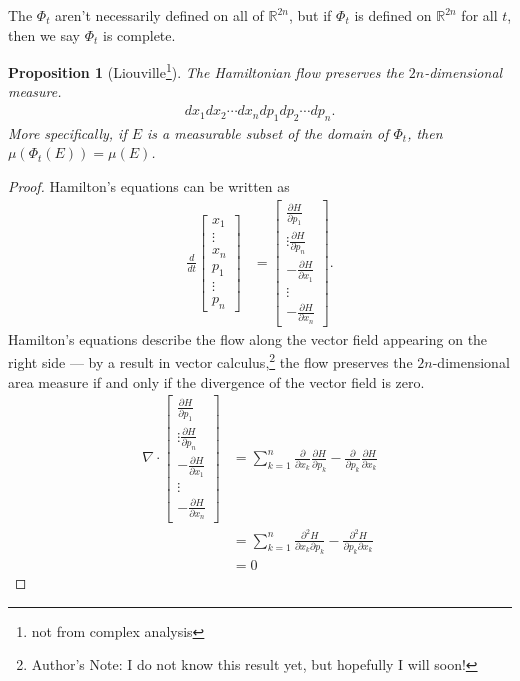 \documentclass[10pt]{extarticle}
\newcommand{\R}{\mathbb{R}}
\theoremstyle{plain}
\newtheorem*{proposition}{Proposition}%
\theoremstyle{definition}
\theoremstyle{remark}
\begin{document}
  The $\Phi_t$ aren't necessarily defined on all of $\R^{2n}$, but if $\Phi_t$ is defined on $\R^{2n}$ for all $t$, then we say $\Phi_t$ is complete.
  \begin{proposition}[Liouville\footnote{not from complex analysis}]
    The Hamiltonian flow preserves the $2n$-dimensional measure.
    \begin{align*}
      dx_1 dx_2 \cdots dx_n dp_1 dp_2 \cdots dp_n.
    \end{align*}
    More specifically, if $E$ is a measurable subset of the domain of $\Phi_t$, then $\mu\left(\Phi_t(E)\right) = \mu(E)$.
  \end{proposition}
  \begin{proof}
    Hamilton's equations can be written as
        \begin{align*}
          \frac{d}{dt} \begin{bmatrix}x_1\\\vdots\\x_n\\p_1\\\vdots\\p_n\end{bmatrix} &= \begin{bmatrix}\frac{\partial H}{\partial p_1}\\\vdots \frac{\partial H}{\partial p_n}\\-\frac{\partial H}{\partial x_1}\\\vdots\\-\frac{\partial H}{\partial x_n}\end{bmatrix}.
        \end{align*}
        Hamilton's equations describe the flow along the vector field appearing on the right side --- by a result in vector calculus,\footnote{Author's Note: I do not know this result yet, but hopefully I will soon!} the flow preserves the $2n$-dimensional area measure if and only if the divergence of the vector field is zero.
        \begin{align*}
          \nabla \cdot \begin{bmatrix}\frac{\partial H}{\partial p_1}\\\vdots \frac{\partial H}{\partial p_n}\\-\frac{\partial H}{\partial x_1}\\\vdots\\-\frac{\partial H}{\partial x_n}\end{bmatrix} &= \sum_{k=1}^{n}\frac{\partial}{\partial x_k}\frac{\partial H}{\partial p_{k}} - \frac{\partial}{\partial p_k}\frac{\partial H}{\partial x_{k}}\\
         &= \sum_{k=1}^{n}\frac{\partial^{2} H}{\partial x_k \partial p_k} - \frac{\partial^2 H}{\partial p_k\partial x_k}\\
          &= 0
        \end{align*}
  \end{proof}
\end{document}
